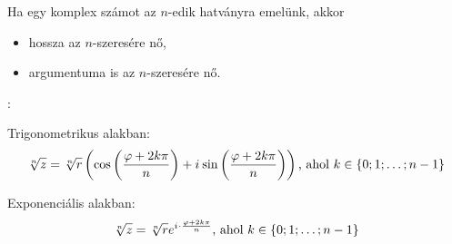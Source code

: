 \documentclass[a4paper, 12pt]{scrartcl}
\begin{document}
\begin{note}
  Ha egy komplex számot az $n$-edik hatványra emelünk, akkor
  \begin{itemize}
    \item hossza az $n$-szeresére nő,
    \item argumentuma is az $n$-szeresére nő.
  \end{itemize}
\end{note}

\begin{blueBox}
  :

  Trigonometrikus alakban:
  \[
    \sqrt[n]{z} = \rcisrad{\sqrt[n]{r}}{
      \frac{\varphi + 2k\pi}{n}
    }
    \text{, ahol }
    k \in \{0; 1; \ldots; n-1\}
  \]

  Exponenciális alakban:
  \[
    \sqrt[n]{z} = \sqrt[n]{r} e^{
        {i\mkern1mu} \cdot \frac{\varphi + 2k\pi}{n}
      }
    \text{, ahol }
    k \in \{0; 1; \ldots; n-1\}
  \]
\end{blueBox}
\end{document}
